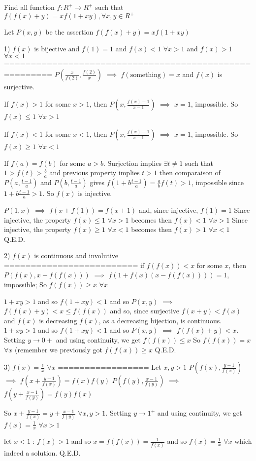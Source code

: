 \begin{solution}
	\begin{tcolorbox}Find all function $f:R^+\rightarrow R^+$  such that
$f(f(x)+y)=xf(1+xy),\forall x,y\in R^+$\end{tcolorbox}
Let $P(x,y)$ be the assertion $f(f(x)+y)=xf(1+xy)$

1) $f(x)$ is bijective and $f(1)=1$ and $f(x)<1$ $\forall x>1$ and $f(x)>1$ $\forall x<1$
=======================================================
$P(\frac x{f(2)},\frac {f(2)}x)$ $\implies$ $f(\text{something})=x$ and $f(x)$ is surjective.

If $f(x)>1$ for some $x>1$, then $P(x,\frac{f(x)-1}{x-1})$ $\implies$ $x=1$, impossible. So $f(x)\le 1$ $\forall x>1$

If $f(x)<1$ for some $x<1$, then $P(x,\frac{f(x)-1}{x-1})$ $\implies$ $x=1$, impossible. So $f(x)\ge 1$ $\forall x<1$

If $f(a)=f(b)$ for some $a>b$. Surjection implies $\exists t\ne 1$ such that $1>f(t)>\frac ba$ and previous property implies $t>1$
then comparaison of $P(a,\frac{t-1}a)$ and $P(b,\frac{t-1}a)$ gives $f(1+b\frac{t-1}a)=\frac abf(t)>1$, impossible since $1+b\frac{t-1}a>1$. So $f(x)$ is injective.

$P(1,x)$ $\implies$ $f(x+f(1))=f(x+1)$ and, since injective, $f(1)=1$
Since injective, the property $f(x)\le 1$ $\forall x>1$ becomes then $f(x)<1$ $\forall x>1$
Since injective, the property $f(x)\ge 1$ $\forall x<1$ becomes then $f(x)>1$ $\forall x<1$
Q.E.D.

2) $f(x)$ is continuous and involutive
=========================
if $f(f(x))<x$ for some $x$, then $P(f(x),x-f(f(x)))$ $\implies$ $f(1+f(x)(x-f(f(x))))=1$, impossible; So $f(f(x))\ge x$ $\forall x$

$1+xy>1$ and so $f(1+xy)<1$ and so $P(x,y)$ $\implies$ $f(f(x)+y)<x\le f(f(x))$ and so, since surjective $f(x+y)<f(x)$ and $f(x)$ is decreasing
$f(x)$, as a decreasing bijection, is continuous.
$1+xy>1$ and so $f(1+xy)<1$ and so $P(x,y)$ $\implies$ $f(f(x)+y)<x$. Setting $y\to 0+$ and using continuity, we get $f(f(x))\le x$
So $f(f(x))=x$ $\forall x$ (remember we previously got $f(f(x))\ge x$
Q.E.D.

3) $f(x)=\frac 1x$ $\forall x$
=================
Let $x,y>1$
$P(f(x),\frac{y-1}{f(x)})$ $\implies$ $f(x+\frac{y-1}{f(x)})=f(x)f(y)$
$P(f(y),\frac{x-1}{f(y)})$ $\implies$ $f(y+\frac{x-1}{f(y)})=f(y)f(x)$

So $x+\frac{y-1}{f(x)}=y+\frac{x-1}{f(y)}$ $\forall x,y>1$. Setting $y\to 1^+$ and using continuity, we get $f(x)=\frac 1x$ $\forall x>1$

let $x<1$ : $f(x)>1$ and so $x=f(f(x))=\frac 1{f(x)}$ and so $\boxed{f(x)=\frac 1x}$ $\forall x$ which indeed a solution.
Q.E.D.
\end{solution}



